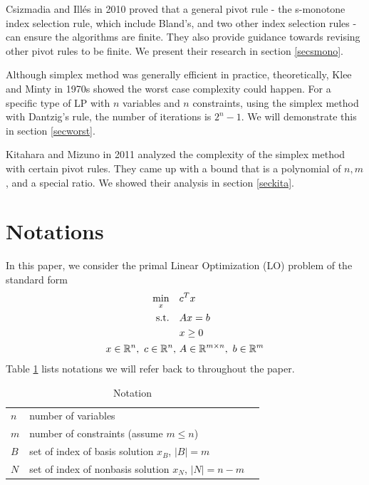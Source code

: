 \documentclass[11pt]{article}
\begin{document}
Csizmadia and Illés in 2010 \cite{csizmadia2012s} proved that a general pivot rule - the s-monotone index selection rule, which include Bland's, and two other index selection rules - can ensure the algorithms are finite. They also provide guidance towards revising other pivot rules to be finite. We present their research in section \ref{secsmono}. 

Although simplex method was generally efficient in practice, theoretically, Klee and Minty \cite{wikipediacontributors_2020_kleeminty} in 1970s showed the worst case complexity could happen. For a specific type of LP with $n$ variables and $n$ constraints, using the simplex method with Dantzig's rule, the number of iterations is $2^n-1$. We will demonstrate this in section \ref{secworst}.

Kitahara and Mizuno in 2011 \cite{kitahara2013bound} analyzed the complexity of the simplex method with certain pivot rules. They came up with a bound that is a polynomial of $n, m$, and a special ratio. We showed their analysis in section \ref{seckita}.

\section{Notations}
In this paper, we consider the primal Linear Optimization (LO) problem of the standard form
\begin{align}
\begin{split}
\min_x \quad &c^Tx\\
\text{s.t.} \quad &Ax = b\\
&x \ge 0\\
 x \in \mathbb{R}^n,\ c \in \mathbb{R}^n,\ &A \in \mathbb{R}^{m\times n},\ b \in \mathbb{R}^m   
\end{split} \label{LOprimal}
\end{align}
Table \ref{tbnotation} lists notations we will refer back to throughout the paper.
\begin{table}[h]
\caption{Notation}
\label{tbnotation}
\centering
\begin{tabular}{lll}
\hline
$n$ & number of variables   &  \\
$m$ & number of constraints (assume $m \le n$) &  \\
$B$ & set of index of basis solution $x_B$, $|B| = m$&  \\
$N$ & set of index of nonbasis solution $x_N$, $|N| = n-m$&  \\
\hline
\end{tabular}
\end{table}
\end{document}
